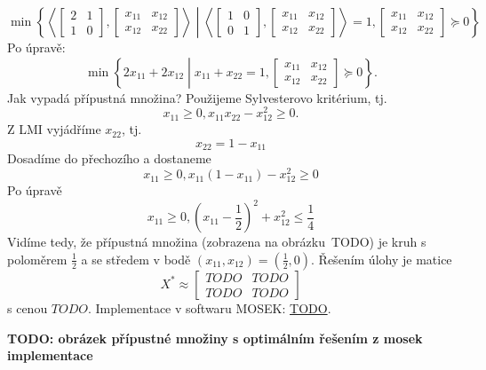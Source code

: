 \begin{pr}
    $$
        \min \left\{
            \left\langle
            \begin{bmatrix}
                2 & 1 \\
                1 & 0
            \end{bmatrix},
            \begin{bmatrix}
                x_{11} & x_{12} \\
                x_{12} & x_{22}
            \end{bmatrix}
            \right\rangle \middle|
            \left\langle
            \begin{bmatrix}
                1 & 0 \\
                0 & 1
            \end{bmatrix},
            \begin{bmatrix}
                x_{11} & x_{12} \\
                x_{12} & x_{22}
            \end{bmatrix}
            \right\rangle = 1,
            \begin{bmatrix}
                x_{11} & x_{12} \\
                x_{12} & x_{22}
            \end{bmatrix} \succeq 0
        \right\}
    $$
    Po úpravě:
    $$
        \min \left\{
            2 x_{11} + 2 x_{12} \middle| x_{11} + x_{22} = 1, 
            \begin{bmatrix}
                x_{11} & x_{12} \\
                x_{12} & x_{22}
            \end{bmatrix} \succeq 0
        \right\}.
    $$
    Jak vypadá přípustná množina? Použijeme Sylvesterovo kritérium, tj.
    $$
        x_{11} \geq 0, x_{11} x_{22} - x_{12}^2 \geq 0.
    $$
    Z LMI vyjádříme $x_{22}$, tj.
    $$
        x_{22} = 1 - x_{11}
    $$
    Dosadíme do přechozího a dostaneme
    $$
        x_{11} \geq 0, x_{11} \left(1 - x_{11}\right) - x_{12}^2 \geq 0
    $$
    Po úpravě
    $$
        x_{11} \geq 0, \left(x_{11} - \frac{1}{2}\right)^2 + x_{12}^2 \leq \frac{1}{4}
    $$
    Vidíme tedy, že přípustná množina (zobrazena na obrázku~TODO) je kruh s poloměrem $\frac{1}{2}$ a se středem v bodě $(x_{11}, x_{12}) = (\frac{1}{2}, 0)$. Řešením úlohy je matice
    $$
        X^* \approx
        \begin{bmatrix}
            TODO & TODO \\
            TODO & TODO
        \end{bmatrix}
    $$
    s cenou $TODO$. Implementace v softwaru MOSEK: \url{TODO}.

    \noindent \textbf{TODO: obrázek přípustné množiny s optimálním řešením z mosek implementace}
\end{pr}

